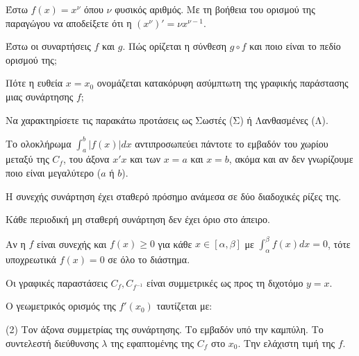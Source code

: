\documentclass[11pt,a4paper]{article}
\newcommand{\kerkissans}[1]{{\fontfamily{maksf}\selectfont \textbf{#1}}}
\renewcommand{\textdexiakeraia}{}
\newcommand{\dint}{\displaystyle\int}
\newcommand\themanum{A}
\newcounter{thema}[section]
\renewcommand{\thethema}{\arabic{thema}}
\newcommand{\Thema}{\refstepcounter{thema}{\textbf{\textcolor{black}{\faPenSquare\ \  \large \kerkissans{\textbf{\thethemaο\hspace{2mm}Διαγώνισμα - Θέμα \themanum}}}}}\hspace{0mm}}{}
\newenvironment{thema}[1]
{\begin{tcolorbox}[title=\Thema\kerkissans{\textbf{\large{  #1}}},breakable,
enhanced standard,titlerule=0pt,toprule=0pt, rightrule=0pt, bottomrule=0pt,
colback=white,left=0mm,top=1mm,bottom=0mm,
boxrule=0pt,
colframe=white,leftrule=0mm,sharp corners,coltitle=black]
\renewcommand{\themanum}{#1}}
{\end{tcolorbox}}
\begin{document}
\begin{thema}{A}
\begin{erwthma}
    \item Έστω $f(x) = x^\nu$ όπου $\nu$ φυσικός αριθμός. Με τη βοήθεια του ορισμού της παραγώγου να αποδείξετε ότι η $(x^\nu)' = \nu x^{\nu - 1}$.
    \item Έστω οι συναρτήσεις $f$ και $g$. Πώς ορίζεται η σύνθεση $g \circ f$ και ποιο είναι το πεδίο ορισμού της;
    \item Πότε η ευθεία $x=x_0$ ονομάζεται κατακόρυφη ασύμπτωτη της γραφικής παράστασης μιας συνάρτησης $f$;
    \item Να χαρακτηρίσετε τις παρακάτω προτάσεις ως Σωστές (Σ) ή Λανθασμένες (Λ).
    \begin{alist}
        \item Το ολοκλήρωμα $\dint_a^b |f(x)| dx$ αντιπροσωπεύει πάντοτε το εμβαδόν του χωρίου μεταξύ της $C_{f}$, του άξονα $x'x$ και των $x=a$ και $x=b$, ακόμα και αν δεν γνωρίζουμε ποιο είναι μεγαλύτερο ($a$ ή $b$).
        \item H συνεχής συνάρτηση έχει σταθερό πρόσημο ανάμεσα σε δύο διαδοχικές ρίζες της.
        \item Κάθε περιοδική μη σταθερή συνάρτηση δεν έχει όριο στο άπειρο.
        \item Αν η $f$ είναι συνεχής και $f(x) \ge 0$ για κάθε $x \in [\alpha, \beta]$ με $\dint_\alpha^\beta f(x) dx = 0$, τότε υποχρεωτικά $f(x) = 0$ σε όλο το διάστημα.
        \item Οι γραφικές παραστάσεις $C_f, C_{f^{-1}}$ είναι συμμετρικές ως προς τη διχοτόμο $y=x$.
    \end{alist}
    \item Ο γεωμετρικός ορισμός της $f'(x_0)$ ταυτίζεται με:
    \begin{tasks}[label=\let\textdexiakeraia\relax\alph*.](2)
        \task Τον άξονα συμμετρίας της συνάρτησης.
        \task Το εμβαδόν υπό την καμπύλη.
        \task Το συντελεστή διεύθυνσης $\lambda$ της εφαπτομένης της $C_f$ στο $x_0$.
        \task Την ελάχιστη τιμή της $f$.
    \end{tasks}
\end{erwthma}
\end{thema}
\vspace{1cm}
\end{document}

